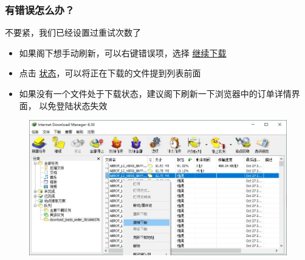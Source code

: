 \begin{frame}
    \frametitle{有错误怎么办？}
    不要紧，我们已经设置过重试次数了\\
    \begin{itemize}
        \item 如果阁下想手动刷新，可以右键错误项，选择 \underline{继续下载}
        \item 点击 \underline{状态}，可以将正在下载的文件提到列表前面\\
        \item 如果没有一个文件处于下载状态，建议阁下刷新一下浏览器中的订单详情界面，
              以免登陆状态失效
    \end{itemize}
    \begin{figure}
        \includegraphics[width=.8\linewidth]{images/41.有错误.jpg}
    \end{figure}

\end{frame}